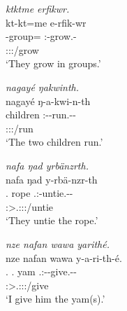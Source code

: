 \begin{exe}
\ex
\label{ex148}
\begin{xlist}
	\ex \textit{ktktme erfikwr.}\\
	\glll kt-kt=me e-rfik-wr\\
	 \Redup{}-group=\Ins{} \Stnsg{}:\Alph{}-grow.\Ext{}-\Ndu{}\\
	 {} \footnotesize{\Stpl:\Sbj:\Nonpast:\Ipfv/grow}\\
	\trans `They grow in groups.'
	\label{ex149}

	\ex \textit{nagayé ŋakwinth.}\\
	\glll nagayé ŋ-a-kwi-n-th\\
	 children \M{}:\Alph{}-\Vc{}-run.\Ext{}-\Du{}-\Stnsg{}\\
	  {} \footnotesize{\Stdu:\Sbj:\Nonpast:\Ipfv/run}\\
	\trans `The two children run.'
	\label{ex150}

	\ex \textit{nafa ŋad yrbänzrth.}\\
	\glll nafa ŋad y-rbä-nzr-th\\
	 \Tnsg{}.\Erg{} rope \Tsg.\Masc:\Alph{}-untie.\Ext{}-\Ndu{}-\Stnsg{}\\
	  {} {} \footnotesize{\Stpl:\Sbj>\Tsg.\Masc:\Obj:\Nonpast:\Ipfv/untie}\\
	\trans `They untie the rope.'
	\label{ex151}

	\ex \textit{nze nafan wawa yarithé.}\\
	\glll nze nafan wawa y-a-ri-th-é.\\
	 \Fsg{}.\Erg{} \Tsg.\Dat{} yam \Tsg{}.\Masc:\Alph{}-\Vc-give.\Ext{}-\Ndu{}-\Fsg{}\\
	  {} {} {} \footnotesize{\Fsg:\Sbj>\Tsg.\Masc:\Io:\Nonpast:\Ipfv/give}\\
	\trans `I give him the yam(s).'
	\label{ex152}
\end{xlist}
\end{exe}

